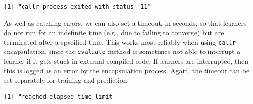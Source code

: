 \begin{Shaded}
\begin{Highlighting}[]
\SpecialCharTok{$}\OtherTok{=} \NormalTok{(} \NormalTok{, } \NormalTok{)}
\SpecialCharTok{$}\SpecialCharTok{$}\OtherTok{=} \NormalTok{(} \NormalTok{)}
\SpecialCharTok{$}\NormalTok{(}\SpecialCharTok{$}
\end{Highlighting}
\end{Shaded}

\begin{verbatim}
[1] "callr process exited with status -11"
\end{verbatim}

As well as catching errors, we can also set a timeout, in seconds, so
that learners do not run for an indefinite time (e.g., due to failing to
converge) but are terminated after a specified time. This works most
reliably when using \texttt{callr} encapsulation, since the
\texttt{evaluate} method is sometimes not able to interrupt a learner if
it gets stuck in external compiled code. If learners are interrupted,
then this is logged as an error by the encapsulation process. Again, the
timeout can be set separately for training and prediction:

\begin{Shaded}
\begin{Highlighting}[]
\SpecialCharTok{$}\OtherTok{=} \NormalTok{(} \NormalTok{, } \NormalTok{)}
\SpecialCharTok{$}\NormalTok{(}\SpecialCharTok{$}
\end{Highlighting}
\end{Shaded}

\begin{verbatim}
[1] "reached elapsed time limit"
\end{verbatim}

